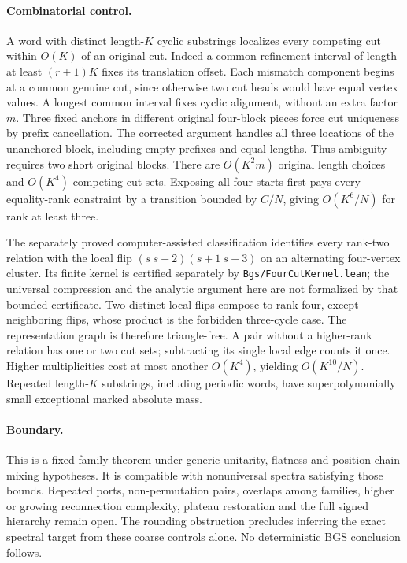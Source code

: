 \paragraph{Combinatorial control.}
A word with distinct length-$K$ cyclic substrings localizes every competing
cut within $O(K)$ of an original cut. Indeed a common refinement interval
of length at least $(r+1)K$ fixes its translation offset. Each mismatch
component begins at a common genuine cut, since otherwise two cut heads
would have equal vertex values. A longest common interval fixes cyclic
alignment, without an extra factor $m$.
Three fixed anchors in different original four-block pieces force cut
uniqueness by prefix cancellation. The corrected argument handles all
three locations of the unanchored block, including empty prefixes and
equal lengths. Thus ambiguity requires two short original blocks.
There are $O(K^2m)$ original length choices and $O(K^4)$ competing cut sets.
Exposing all four starts first pays every equality-rank constraint by a
transition bounded by $C/N$, giving $O(K^6/N)$ for rank at least three.

The separately proved computer-assisted classification identifies every
rank-two relation with the local flip
$(s\ s+2)(s+1\ s+3)$ on an alternating four-vertex cluster.
Its finite kernel is certified separately by
\texttt{Bgs/FourCutKernel.lean}; the universal compression and the
analytic argument here are not formalized by that bounded certificate.
Two distinct local flips compose to rank four, except neighboring flips,
whose product is the forbidden three-cycle case. The representation graph
is therefore triangle-free. A pair without a higher-rank relation has one
or two cut sets; subtracting its single local edge counts it once.
Higher multiplicities cost at most another $O(K^4)$, yielding
$O(K^{10}/N)$. Repeated length-$K$ substrings, including periodic words,
have superpolynomially small exceptional marked absolute mass.

\paragraph{Boundary.}
This is a fixed-family theorem under generic unitarity, flatness and
position-chain mixing hypotheses. It is compatible with nonuniversal
spectra satisfying those bounds. Repeated ports, non-permutation pairs,
overlaps among families, higher or growing reconnection complexity,
plateau restoration and the full signed hierarchy remain open.
The rounding obstruction precludes inferring the exact spectral target
from these coarse controls alone. No deterministic BGS conclusion follows.
